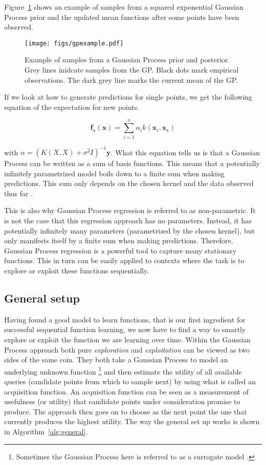 \documentclass[authoryear,11pt,review]{elsarticle}
\begin{document}
Figure~\ref{fig:gpexample} shows an example of samples from a squared exponential Gaussian Process prior and the updated mean functions after some points have been observed.

\begin{figure}[ht]
\texttt{[image: figs/gpexample.pdf]}
\caption{Example of samples from a Gaussian Process prior and posterior. Grey lines inidcate samples from the GP. Black dots mark empirical observations. The dark grey line marks the current mean of the GP.}
\label{fig:gpexample}
\end{figure}

If we look at how to generate predictions for single points, we get the following equation of the expectation for new points.

\begin{equation*}
\mathbf{f}_\star(\mathbf{x})=\sum_{i=1}^{n}\alpha_{i}k(\mathbf{x}_i,\mathbf{x}_\star)
\end{equation*}

with $\alpha=\left(K(X,X)+\sigma^2I\right)^{-1}\mathbf{y}$.
What this equation tells us is that a Gaussian Process can be written as a sum of basis functions. This means that a potentially infinitely parametrized model boils down to a finite sum when making predictions. This sum only depends on the chosen kernel and the data observed thus far \citep{kac1947explicit}. 

This is also why Gaussian Process regression is referred to as non-parametric. It is not the case that this regression approach has no parameters. Instead, it has potentially infinitely many parameters (parametrized by the chosen kernel), but only manifests itself by a finite sum when making predictions. Therefore, Gaussian Process regression is a powerful tool to capture many stationary functions. This in turn can be easily applied to contexts where the task is to explore or exploit these functions sequentially.

\subsection{General setup}
Having found a good model to learn functions, that is our first ingredient for successful sequential function learning, we now have to find a way to smartly explore or exploit the function we are learning over time. Within  the Gaussian Process approach both pure \emph{exploration} and \emph{exploitation} can be viewed as two sides of the same coin. They both take a Gaussian Process to model an underlying unknown function \footnote{Sometimes the Gaussian Process here is referred to as a surrogate model \citep{gramacy2008bayesian}.} and then estimate the utility of all available queries (candidate points from which to sample next) by using what is called an acquisition function. An acquisition function can be seen as a measurement of usefulness (or utility) that candidate points under consideration promise to produce. The approach then goes on to choose as the next point the one that currently produces the highest utility. The way the general set up works is shown in Algorithm~\ref{alg:general}.
\end{document}
